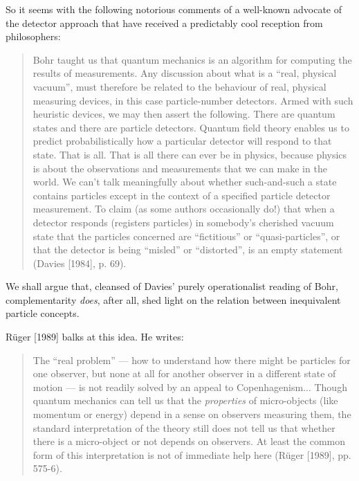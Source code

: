 \documentclass[12pt]{article}
\theoremstyle{remark}
\theoremstyle{definition}
\begin{document}
So it seems with the following notorious comments of a well-known advocate of
the detector approach that have received a predictably cool reception
from philosophers:

\begin{quote}
Bohr taught us that quantum mechanics is an algorithm for computing the
results of measurements. Any discussion about what is a ``real, physical
vacuum'', must therefore be related to the behaviour of real, physical
measuring devices, in this case particle-number detectors. Armed with such
heuristic devices, we may then assert the following. There are quantum
states and there are particle detectors. Quantum field theory enables us to
predict probabilistically how a particular detector will respond to that
state. That is all. That is all there can ever be in physics, because
physics is about the observations and measurements that we can make in the
world. We can't talk meaningfully about whether such-and-such a state
contains particles except in the context of a specified particle detector
measurement. To claim (as some authors occasionally do!) that when a
detector responds (registers particles) in somebody's cherished vacuum state
that the particles concerned are ``fictitious'' or ``quasi-particles'', or that
the detector is being ``misled'' or ``distorted'', is an empty statement (Davies
[1984], p. 69).
\end{quote}
\noindent We shall argue that, cleansed of Davies' purely 
operationalist reading 
of Bohr, 
complementarity \emph{does}, after all, shed light on the relation 
between inequivalent particle concepts.

R\"{u}ger [1989] balks at this idea.  He writes:  
\begin{quote}
  The ``real problem'' --- how to understand how there might be
  particles for one observer, but none at all for another observer in
  a different state of motion --- is not readily solved by an appeal
  to Copenhagenism... Though quantum mechanics can tell us that the
  \textit{properties} of micro-objects (like momentum or energy)
  depend in a sense on observers measuring them, the standard
  interpretation of the theory still does not tell us that whether
  there is a micro-object or not depends on observers. At least the
  common form of this interpretation is not of immediate help here
  (R\"{u}ger [1989], pp. 575-6).
\end{quote}
\end{document}
